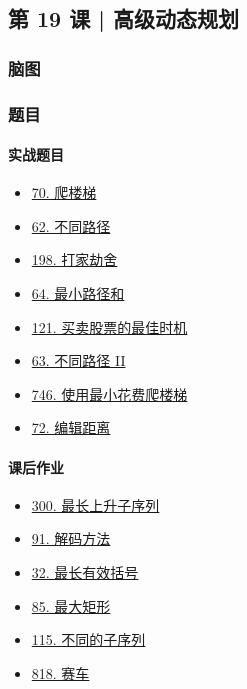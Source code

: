 \subsection{第 19 课 | 高级动态规划}

\subsubsection{脑图}

\subsubsection{题目}

\paragraph{实战题目}

\begin{itemize}
  \item \hyperref[leetcode:70]{70. 爬楼梯}
  \item \hyperref[leetcode:62]{62. 不同路径}
  \item \hyperref[leetcode:198]{198. 打家劫舍}
  \item \hyperref[leetcode:64]{64. 最小路径和}
  \item \hyperref[leetcode:121]{121. 买卖股票的最佳时机}
  \item \hyperref[leetcode:63]{63. 不同路径 II}
  \item \hyperref[leetcode:746]{746. 使用最小花费爬楼梯}
  \item \hyperref[leetcode:72]{72. 编辑距离}
\end{itemize}

\paragraph{课后作业}

\begin{itemize}
  \item \hyperref[leetcode:300]{300. 最长上升子序列}
  \item \hyperref[leetcode:91]{91. 解码方法}
  \item \hyperref[leetcode:32]{32. 最长有效括号}
  \item \hyperref[leetcode:85]{85. 最大矩形}
  \item \hyperref[leetcode:115]{115. 不同的子序列}
  \item \hyperref[leetcode:818]{818. 赛车}
\end{itemize}

